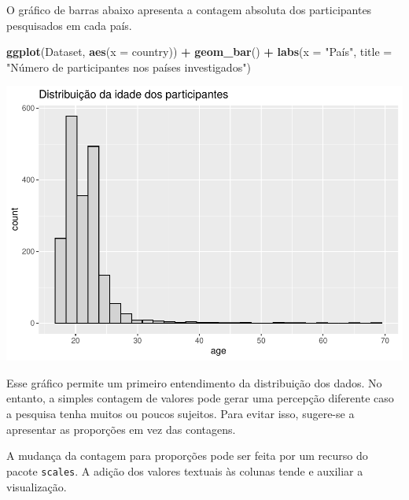 \documentclass[
]{book}
\newenvironment{Shaded}{\begin{snugshade}}{\end{snugshade}}
\newcommand{\DataTypeTok}[1]{\textcolor[rgb]{0.13,0.29,0.53}{#1}}
\newcommand{\KeywordTok}[1]{\textcolor[rgb]{0.13,0.29,0.53}{\textbf{#1}}}
\newcommand{\NormalTok}[1]{#1}
\newcommand{\OperatorTok}[1]{\textcolor[rgb]{0.81,0.36,0.00}{\textbf{#1}}}
\newcommand{\StringTok}[1]{\textcolor[rgb]{0.31,0.60,0.02}{#1}}
\begin{document}
O gráfico de barras abaixo apresenta a contagem absoluta dos participantes pesquisados em cada país.

\begin{Shaded}
\begin{Highlighting}[]
\KeywordTok{ggplot}\NormalTok{(Dataset, }\KeywordTok{aes}\NormalTok{(}\DataTypeTok{x =}\NormalTok{ country)) }\OperatorTok{+}
\StringTok{  }\KeywordTok{geom_bar}\NormalTok{() }\OperatorTok{+}
\StringTok{  }\KeywordTok{labs}\NormalTok{(}\DataTypeTok{x =} \StringTok{"País"}\NormalTok{, }\DataTypeTok{title =} \StringTok{"Número de participantes nos países investigados"}\NormalTok{)}
\end{Highlighting}
\end{Shaded}

\begin{center}\includegraphics{gitbook-demo_files/figure-latex/unnamed-chunk-16-1} \end{center}

Esse gráfico permite um primeiro entendimento da distribuição dos dados. No entanto, a simples contagem de valores pode gerar uma percepção diferente caso a pesquisa tenha muitos ou poucos sujeitos. Para evitar isso, sugere-se a apresentar as proporções em vez das contagens.

A mudança da contagem para proporções pode ser feita por um recurso do pacote \texttt{scales}. A adição dos valores textuais às colunas tende e auxiliar a visualização.
\end{document}
